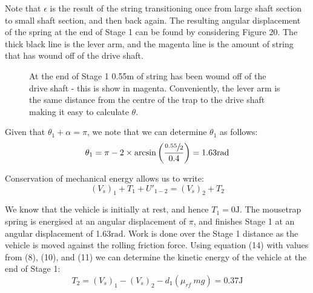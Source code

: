 \documentclass[a4paper]{article}
\begin{document}
Note that $\epsilon$ is the result of the string transitioning once from large shaft section to small shaft section, and then back again. The resulting angular displacement of the spring at the end of Stage 1 can be found by considering Figure 20. The thick black line is the lever arm, and the magenta line is the amount of string that has wound off of the drive shaft.

\begin{figure}[h]
	\centering
	\caption{At the end of Stage 1 0.55m of string has been wound off of the drive shaft - this is show in magenta. Conveniently, the lever arm is the same distance from the centre of the trap to the drive shaft making it easy to calculate $\theta$.}
\end{figure}

Given that $\theta_1 + \alpha = \pi$, we note that we can determine $\theta_1$ as follows:
\begin{equation}
	\theta_1 = \pi - 2 \times \arcsin \bigg( \frac{\sfrac{0.55}{2}}{0.4} \bigg) = 1.63\si{\radian}
\end{equation}

Conservation of mechanical energy allows us to write:
\begin{equation}
	(V_s)_1 + T_1 + U'_{1-2} = (V_s)_2 + T_2
\end{equation}

We know that the vehicle is initially at rest, and hence $T_1 = 0\si{\joule}$. The mousetrap spring is energised at an angular displacement of $\pi$, and finishes Stage 1 at an angular displacement of 1.63$\si{\radian}$. Work is done over the Stage 1 distance as the vehicle is moved against the rolling friction force. Using equation (14) with values from (8), (10), and (11) we can determine the kinetic energy of the vehicle at the end of Stage 1:
\begin{equation}
	T_2 = (V_s)_1 - (V_s)_2 - d_1 (\mu_{rf} \ mg) = 0.37\si{\joule}
\end{equation}
\end{document}
